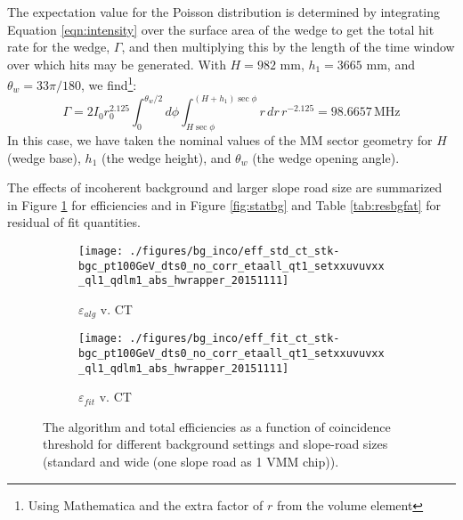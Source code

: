 The expectation value for the Poisson distribution is determined by integrating Equation \ref{eqn:intensity} over the surface area of the wedge to get the total hit rate for the wedge, $\Gamma$, and then multiplying this by the length of the time window over which hits may be generated.  With $H=982$ mm, $h_1=3665$ mm, and $\theta_w=33\pi/180$, we find\footnote{Using Mathematica and the extra factor of $r$ from the volume element}:
\begin{equation}
\Gamma=2I_0r_0^{2.125}\int_0^{\theta_w/2}d\phi\int_{H\sec\phi}^{\left(H+h_1\right)\sec\phi}r\,dr\,r^{-2.125}=98.6657\,\text{MHz}
\end{equation}
In this case, we have taken the nominal values of the MM sector geometry for $H$ (wedge base), $h_1$ (the wedge height), and $\theta_w$ (the wedge opening angle).


  The effects of incoherent background and larger slope road size are summarized in Figure \ref{fig:effbg} for efficiencies and in Figure \ref{fig:statbg} and Table \ref{tab:resbgfat} for residual of fit quantities.

\begin{figure}[!htbp]\captionsetup{justification=centering}\captionsetup{justification=centering}
  \begin{center}
\begin{subfigure}[t]{0.450\textwidth\textwidth}\centering\texttt{[image: ./figures/bg\_inco/eff\_std\_ct\_stk-bgc\_pt100GeV\_dts0\_no\_corr\_etaall\_qt1\_setxxuvuvxx\_ql1\_qdlm1\_abs\_hwrapper\_20151111]}\caption{$\varepsilon_{alg}$ v. CT}\end{subfigure}
\begin{subfigure}[t]{0.450\textwidth\textwidth}\centering\texttt{[image: ./figures/bg\_inco/eff\_fit\_ct\_stk-bgc\_pt100GeV\_dts0\_no\_corr\_etaall\_qt1\_setxxuvuvxx\_ql1\_qdlm1\_abs\_hwrapper\_20151111]}\caption{$\varepsilon_{fit}$ v. CT}\end{subfigure}
    \caption{\label{fig:effbg} The algorithm and total efficiencies as a function of coincidence threshold for different background settings and slope-road sizes (standard and wide (one slope road as 1 VMM chip)).}
  \end{center}
\end{figure}

